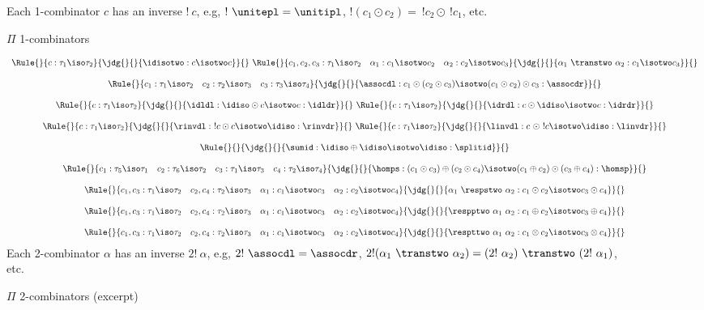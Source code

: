\begin{figure}[ht]
Each 1-combinator $c$ has an inverse $!~c$, e.g, $!~\unitepl=\unitipl$,
$!(c_1 \odot c_2) = ~!c_2 \odot~ !c_1$, etc.
\caption{$\Pi$ 1-combinators~\cite{James:2012:IE:2103656.2103667}
\label{pi-combinators}}
\end{figure}

\begin{figure}[ht]
\[\begin{array}{c}
\Rule{}
{c : \tau_1 \iso \tau_2}
{\jdg{}{}{\idisotwo : c \isotwo c}}
{}
~
\Rule{}
{c_1,c_2,c_3 : \tau_1 \iso \tau_2 \quad \alpha_1 : c_1 \isotwo c_2 \quad \alpha_2 : c_2 \isotwo c_3}
{\jdg{}{}{\alpha_1~\transtwo~\alpha_2 : c_1 \isotwo c_3}}
{}
\\
\\
\Rule{}
{c_1 : \tau_1 \iso \tau_2 \quad c_2 : \tau_2 \iso \tau_3 \quad c_3 : \tau_3 \iso \tau_4}
{\jdg{}{}{\assocdl : c_1 \odot (c_2 \odot c_3) \isotwo (c_1 \odot c_2) \odot c_3 : \assocdr}}
{}
\\
\\
\Rule{}
{c : \tau_1 \iso \tau_2}
{\jdg{}{}{\idldl : \idiso \odot c \isotwo c : \idldr}}
{}
~
\Rule{}
{c : \tau_1 \iso \tau_2}
{\jdg{}{}{\idrdl : c \odot \idiso \isotwo c : \idrdr}}
{}
\\
\\
\Rule{}
{c : \tau_1 \iso \tau_2}
{\jdg{}{}{\rinvdl : ~! c \odot c \isotwo \idiso : \rinvdr}}
{}
~
\Rule{}
{c : \tau_1 \iso \tau_2}
{\jdg{}{}{\linvdl : c ~\odot ~! c \isotwo \idiso : \linvdr}}
{}
\\
\\
\Rule{}
{}
{\jdg{}{}{\sumid : \idiso\oplus\idiso \isotwo \idiso : \splitid}}
{}
\\
\\
\Rule{}
{c_1 : \tau_5\iso\tau_1 \quad c_2 : \tau_6\iso\tau_2 \quad c_3 :
    \tau_1\iso\tau_3 \quad c_4 : \tau_2\iso\tau_4}
{\jdg{}{}{\homps : (c_1\odot c_3)\oplus(c_2\odot c_4) \isotwo
    (c_1\oplus c_2) \odot (c_3\oplus c_4) : \homsp }}
{}
\\
\\
\Rule{}
{c_1,c_3 : \tau_1 \iso \tau_2 \quad c_2,c_4 : \tau_2 \iso \tau_3 \quad
  \alpha_1 : c_1 \isotwo c_3 \quad \alpha_2 : c_2 \isotwo c_4}
{\jdg{}{}{\alpha_1 ~\respstwo~ \alpha_2 : c_1 \odot c_2 \isotwo c_3 \odot c_4}}
{}
\\
\\
\Rule{}
{c_1,c_3 : \tau_1 \iso \tau_2 \quad c_2,c_4 : \tau_2 \iso \tau_3 \quad
  \alpha_1 : c_1 \isotwo c_3 \quad \alpha_2 : c_2 \isotwo c_4}
{\jdg{}{}{\respptwo ~\alpha_1 ~\alpha_2 : c_1 \oplus c_2 \isotwo c_3 \oplus c_4}}
{}
\\
\\
\Rule{}
{c_1,c_3 : \tau_1 \iso \tau_2 \quad c_2,c_4 : \tau_2 \iso \tau_3 \quad
  \alpha_1 : c_1 \isotwo c_3 \quad \alpha_2 : c_2 \isotwo c_4}
{\jdg{}{}{\respttwo ~\alpha_1 ~\alpha_2 : c_1 \otimes c_2 \isotwo c_3 \otimes c_4}}
{}
\end{array}\]
Each 2-combinator $\alpha$ has an inverse $2!~\alpha$, e.g, $2!~\assocdl=\assocdr$,
$2!(\alpha_1~\transtwo~\alpha_2) = (2!~\alpha_2)~\transtwo~(2!~\alpha_1)$, etc.
\caption{$\Pi$ 2-combinators (excerpt)~\cite{Carette2016}
\label{pi-combinators2}}
\end{figure}

